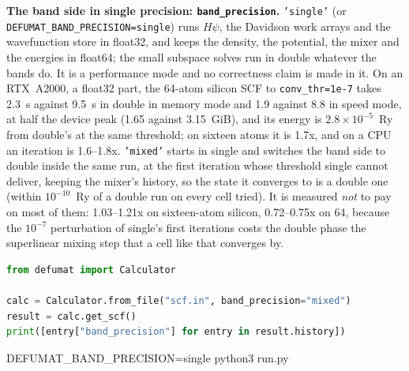 \documentclass[11pt,a4paper]{article}
\newcommand{\code}[1]{\texttt{\small #1}}
\begin{document}
\textbf{The band side in single precision: \code{band\_precision}.} \code{'single'}
(or \code{DEFUMAT\_BAND\_PRECISION=single}) runs $H\psi$, the Davidson work arrays
and the wavefunction store in float32, and keeps the density, the potential, the
mixer and the energies in float64; the small subspace solves run in double
whatever the bands do. It is a performance mode and no correctness claim is made
in it. On an RTX~A2000, a float32 part, the 64-atom silicon SCF to
\code{conv\_thr=1e-7} takes 2.3~s against 9.5~s in double in memory mode and 1.9
against 8.8 in speed mode, at half the device peak (1.65 against 3.15~GiB), and
its energy is $2.8\times10^{-5}$~Ry from double's at the same threshold; on sixteen
atoms it is 1.7x, and on a CPU an iteration is 1.6--1.8x. \code{'mixed'} starts in single and switches the band side to double
inside the same run, at the first iteration whose threshold single cannot deliver,
keeping the mixer's history, so the state it converges to is a double one (within
$10^{-10}$~Ry of a double run on every cell tried). It is measured \emph{not} to pay
on most of them: 1.03--1.21x on sixteen-atom silicon, 0.72--0.75x on 64, because
the $10^{-7}$ perturbation of single's first iterations costs the double phase the
superlinear mixing step that a cell like that converges by.

\begin{lstlisting}[language=Python]
from defumat import Calculator

calc = Calculator.from_file("scf.in", band_precision="mixed")
result = calc.get_scf()
print([entry["band_precision"] for entry in result.history])
\end{lstlisting}

\begin{shcode}
DEFUMAT_BAND_PRECISION=single python3 run.py
\end{shcode}
\end{document}
